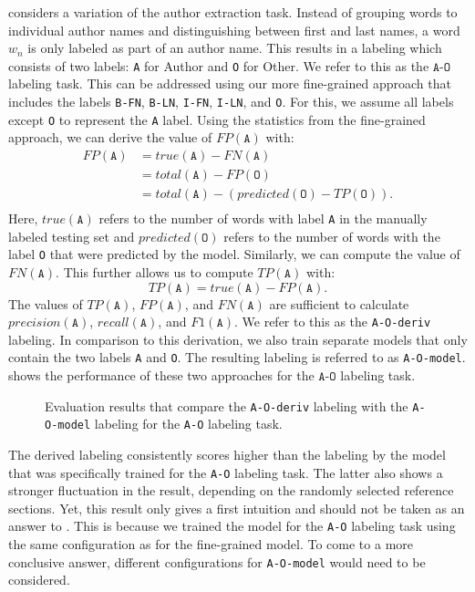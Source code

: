 \bigskip

 considers a variation of the author extraction task.
Instead of grouping words to individual author names and distinguishing between first and last names, a word $w_n$ is only labeled as part of an author name.
This results in a labeling which consists of two labels:
\texttt{A} for Author and \texttt{O} for Other.
We refer to this as the $\texttt{A-O}$ labeling task.
This can be addressed using our more fine-grained approach that includes the labels \texttt{B-FN}, \texttt{B-LN}, \texttt{I-FN}, \texttt{I-LN}, and \texttt{O}.
For this, we assume all labels except \texttt{O} to represent the \texttt{A} label.
Using the statistics from the fine-grained approach, we can derive the value of $FP(\texttt{A})$ with:
\begin{equation*}
\begin{split}
  FP(\texttt{A})&=true(\texttt{A})-FN(\texttt{A})\\
  &=total(\texttt{A})-FP(\texttt{O})\\
  &=total(\texttt{A})-(predicted(\texttt{O})-TP(\texttt{O})).\\
\end{split}
\end{equation*}
Here, $true(\texttt{A})$ refers to the number of words with label \texttt{A} in the manually labeled testing set and $predicted(\texttt{O})$ refers to the number of words with the label \texttt{O} that were predicted by the model.
Similarly, we can compute the value of $FN(\texttt{A})$.
This further allows us to compute $TP(\texttt{A})$ with:
\begin{equation*}
  TP(\texttt{A})=true(\texttt{A})-FP(\texttt{A}).
\end{equation*}
The values of $TP(\texttt{A})$, $FP(\texttt{A})$, and $FN(\texttt{A})$ are sufficient to calculate $precision(\texttt{A})$, $recall(\texttt{A})$, and $F1(\texttt{A})$.
We refer to this as the \texttt{A-O-deriv} labeling.
In comparison to this derivation, we also train separate models that only contain the two labels \texttt{A} and \texttt{O}.
The resulting labeling is referred to as \texttt{A-O-model}.
 shows the performance of these two approaches for the $\texttt{A-O}$ labeling task.
\begin{figure}

\caption{Evaluation results that compare the \texttt{A-O-deriv} labeling with the \texttt{A-O-model} labeling for the \texttt{A-O} labeling task.}
\label{fig:eval-authors-only}
\end{figure}
The derived labeling consistently scores higher than the labeling by the model that was specifically trained for the \texttt{A-O} labeling task.
The latter also shows a stronger fluctuation in the result, depending on the randomly selected reference sections.
Yet, this result only gives a first intuition and should not be taken as an answer to .
This is because we trained the model for the \texttt{A-O} labeling task using the same configuration as for the fine-grained model.
To come to a more conclusive answer, different configurations for \texttt{A-O-model} would need to be considered.


